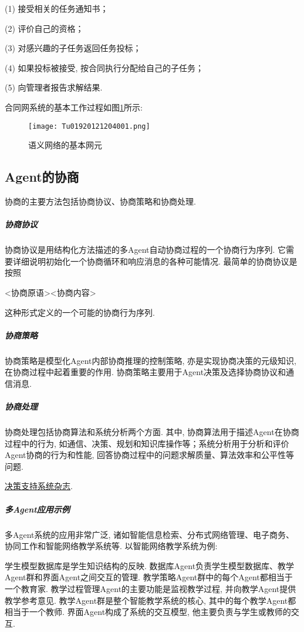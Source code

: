     (1) 接受相关的任务通知书；

    (2) 评价自己的资格；

    (3) 对感兴趣的子任务返回任务投标；

    (4) 如果投标被接受, 按合同执行分配给自己的子任务；

    (5)  向管理者报告求解结果.

合同网系统的基本工作过程如图\ref{Tu01920121204001}所示:
\begin{figure}[H]
\centering
\texttt{[image: Tu01920121204001.png]}
\caption{语义网络的基本网元}
\label{Tu01920121204001}
\end{figure}
\subsection{Agent的协商}
协商的主要方法包括协商协议、协商策略和协商处理.
\subparagraph{协商协议}
    协商协议是用结构化方法描述的多Agent自动协商过程的一个协商行为序列. 它需要详细说明初始化一个协商循环和响应消息的各种可能情况. 最简单的协商协议是按照
\begin{center}
  <协商原语><协商内容>
\end{center}
这种形式定义的一个可能的协商行为序列.
\subparagraph{协商策略}
协商策略是模型化Agent内部协商推理的控制策略, 亦是实现协商决策的元级知识, 在协商过程中起着重要的作用. 协商策略主要用于Agent决策及选择协商协议和通信消息.
\subparagraph{协商处理}
协商处理包括协商算法和系统分析两个方面. 其中, 协商算法用于描述Agent在协商过程中的行为, 如通信、决策、规划和知识库操作等；系统分析用于分析和评价Agent协商的行为和性能, 回答协商过程中的问题求解质量、算法效率和公平性等问题.

\href{https://www.sciencedirect.com/journal/decision-support-systems}{决策支持系统杂志}.
\subparagraph{多Agent应用示例}
多Agent系统的应用非常广泛, 诸如智能信息检索、分布式网络管理、电子商务、协同工作和智能网络教学系统等. 以智能网络教学系统为例:
\begin{example}
学生模型数据库是学生知识结构的反映. 数据库Agent负责学生模型数据库、教学Agent群和界面Agent之间交互的管理. 教学策略Agent群中的每个Agent都相当于一个教育家. 教学过程管理Agent的主要功能是监视教学过程, 并向教学Agent提供教学参考意见. 教学Agent群是整个智能教学系统的核心, 其中的每个教学Agent都相当于一个教师. 界面Agent构成了系统的交互模型, 他主要负责与学生或教师的交互.
\end{example}
